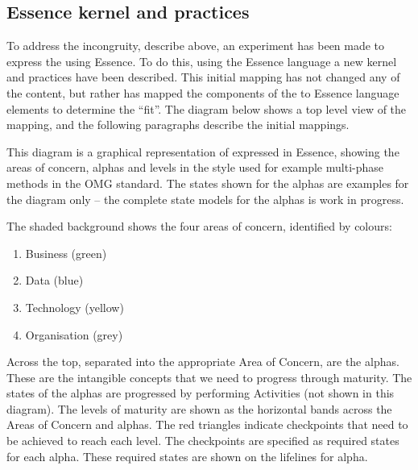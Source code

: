 \subsection{ Essence kernel and practices}\label{subsec:KG-MM-Essence-kernel-and-practices}
To address the incongruity, describe above, an experiment has been made to express the  using Essence. To do this, using the Essence
language a new kernel and practices have been described. This initial mapping has not changed any of the content, but rather has mapped the components of
the  to Essence language elements to determine the “fit”.
The diagram below shows a top level view of the mapping, and the following paragraphs describe the initial mappings.


This diagram is a graphical representation of  expressed in Essence, showing the areas of concern, alphas and levels in the style used for
example multi-phase methods in the OMG standard. The states shown for the alphas are examples for the diagram only – the complete state models for the alphas is work in progress.

The shaded background shows the four areas of concern, identified by colours:
\begin{enumerate}
    \item Business (green)
    \item Data (blue)
    \item Technology (yellow)
    \item Organisation (grey)
\end{enumerate}

Across the top, separated into the appropriate Area of Concern, are the alphas.
These are the intangible concepts that we need to progress through maturity.
The states of the alphas are progressed by performing Activities (not shown in this diagram).
The levels of maturity are shown as the horizontal bands across the Areas of Concern and alphas.
The red triangles indicate checkpoints that need to be achieved to reach each level.
The checkpoints are specified as required states for each alpha.
These required states are shown on the lifelines for alpha.


